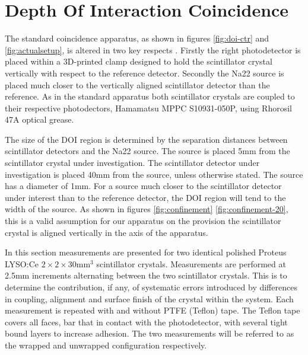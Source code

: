 \section{Depth Of Interaction Coincidence}
The standard coincidence apparatus, as shown in figures \ref{fig:doi-ctr} and \ref{fig:actualsetup}, is altered in two key respects . Firstly the right photodetector is placed within a 3D-printed clamp designed to hold the scintillator crystal vertically with respect to the reference detector. Secondly the Na22 source is placed much closer to the vertically aligned scintillator detector than the reference. As in the standard apparatus both scintillator crystals are coupled to their respective photodectors, Hamamatsu MPPC S10931-050P, using Rhorosil 47A optical grease. 

The size of the DOI region is determined by the separation distances between scintillator detectors and the Na22 source.  The source is placed 5mm from the scintillator crystal under investigation. The scintillator detector under investigation is placed 40mm from the source, unless otherwise stated. The source has a diameter of 1mm. For a source much closer to the scintillator detector under interest than to the reference detector, the DOI region will tend to the width of the source. As shown in figures \ref{fig:confinement} \ref{fig:confinement-20}, this is a valid assumption for our apparatus on the provision the scintillator crystal is aligned vertically in the axis of the apparatus.

In this section measurements are presented for two identical polished Proteus LYSO:Ce $2\times2\times30$mm$^3$ scintillator crystals. Measurements are performed at 2.5mm increments alternating between the two scintillator crystals. This is to determine the contribution, if any, of systematic errors introduced by differences in coupling, alignment and surface finish of the crystal within the system. Each measurement is repeated with and without PTFE (Teflon) tape. The Teflon tape covers all faces, bar that in contact with the photodetector, with several tight bound layers to increase adhesion. The two measurements will be referred to as the wrapped and unwrapped configuration respectively.
